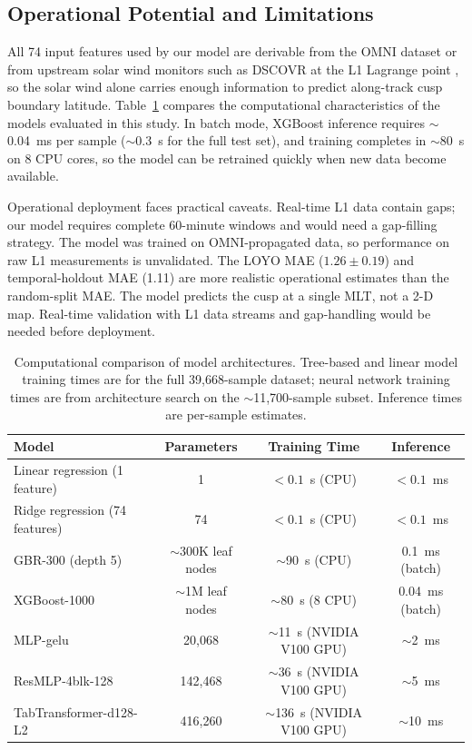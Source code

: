 \documentclass[draft]{agujournal2019}
\begin{document}
\subsection{Operational Potential and Limitations}

All 74 input features used by our model are derivable from the OMNI dataset or from upstream solar wind monitors such as DSCOVR at the L1 Lagrange point \cite{king2005omni}, so the solar wind alone carries enough information to predict along-track cusp boundary latitude. Table~\ref{tab:computational} compares the computational characteristics of the models evaluated in this study. In batch mode, XGBoost inference requires $\sim$0.04~ms per sample ($\sim$0.3~s for the full test set), and training completes in $\sim$80~s on 8 CPU cores, so the model can be retrained quickly when new data become available.

Operational deployment faces practical caveats. Real-time L1 data contain gaps; our model requires complete 60-minute windows and would need a gap-filling strategy. The model was trained on OMNI-propagated data, so performance on raw L1 measurements is unvalidated. The LOYO MAE ($1.26 \pm 0.19$\textdegree) and temporal-holdout MAE (1.11\textdegree) are more realistic operational estimates than the random-split MAE. The model predicts the cusp at a single MLT, not a 2-D map. Real-time validation with L1 data streams and gap-handling would be needed before deployment.

\begin{table}[htbp]
\centering
\caption{Computational comparison of model architectures. Tree-based and linear model training times are for the full 39,668-sample dataset; neural network training times are from architecture search on the $\sim$11,700-sample subset. Inference times are per-sample estimates.}
\label{tab:computational}
\begin{tabular}{lccc}
\toprule
Model & Parameters & Training Time & Inference \\
\midrule
Linear regression (1 feature) & 1 & $<0.1$~s (CPU) & $<0.1$~ms \\
Ridge regression (74 features) & 74 & $<0.1$~s (CPU) & $<0.1$~ms \\
GBR-300 (depth 5) & $\sim$300K leaf nodes & $\sim$90~s (CPU) & 0.1~ms (batch) \\
XGBoost-1000 & $\sim$1M leaf nodes & $\sim$80~s (8 CPU) & 0.04~ms (batch) \\
MLP-gelu & 20,068 & $\sim$11~s (NVIDIA V100 GPU) & $\sim$2~ms \\
ResMLP-4blk-128 & 142,468 & $\sim$36~s (NVIDIA V100 GPU) & $\sim$5~ms \\
TabTransformer-d128-L2 & 416,260 & $\sim$136~s (NVIDIA V100 GPU) & $\sim$10~ms \\
\bottomrule
\end{tabular}
\end{table}
\end{document}
